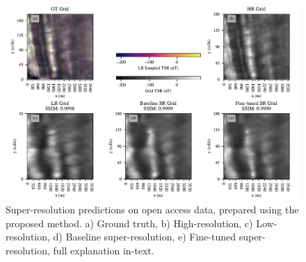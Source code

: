 \begin{landscape}
    \begin{figure}[hbtp]
        \centering
        \includegraphics[width=1\linewidth]{fig/p2/srcomp_18.pdf}
        \caption[Super-resolution geophysics grid results IV]{Super-resolution predictions on open access data, prepared using the proposed method.
            a) Ground truth, b) High-resolution, c) Low-resolution, d) Baseline super-resolution, e) Fine-tuned super-resolution, full explanation in-text.
        }  
        \label{fig:srdata18}
    \end{figure}
\end{landscape}


